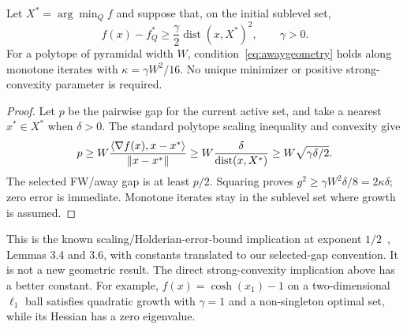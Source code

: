 \begin{proposition}
\label{prop:qg}
Let $X^*=\arg\min_Q f$ and suppose that, on the initial sublevel set,
\[
 f(x)-f_Q^*\ge\frac\gamma2\operatorname{dist}(x,X^*)^2,
 \qquad\gamma>0.
\]
For a polytope of pyramidal width $W$, condition~\eqref{eq:awaygeometry}
holds along monotone iterates with $\kappa=\gamma W^2/16$.
No unique minimizer or positive strong-convexity parameter is required.
\end{proposition}
\begin{proof}
Let $p$ be the pairwise gap for the current active set, and take a
nearest $x^*\in X^*$ when $\delta>0$. The standard polytope scaling
inequality and convexity give
\[
 p\ge W\frac{\left\langle\nabla f(x),x-x^*\right\rangle}{\left\|x-x^*\right\|}
   \ge W\frac\delta{\operatorname{dist}(x,X^*)}
   \ge W\sqrt{\gamma\delta/2}.
\]
The selected FW/away gap is at least $p/2$. Squaring proves
$g^2\ge\gamma W^2\delta/8=2\kappa\delta$; zero error is immediate.
Monotone iterates stay in the sublevel set where growth is assumed.
\end{proof}
This is the known scaling/Holderian-error-bound implication at exponent
$1/2$~\cite{restartfw}, Lemmas 3.4 and 3.6, with constants translated
to our selected-gap convention. It is not a new geometric result.
The direct strong-convexity implication above has a better constant.
For example, $f(x)=\cosh(x_1)-1$ on a two-dimensional $\ell_1$ ball
satisfies quadratic growth with $\gamma=1$ and a non-singleton optimal
set, while its Hessian has a zero eigenvalue.

